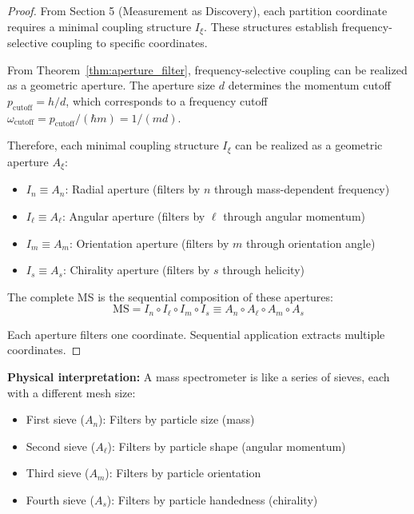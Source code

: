 \begin{proof}
From Section 5 (Measurement as Discovery), each partition coordinate requires a minimal coupling structure $I_\xi$. These structures establish frequency-selective coupling to specific coordinates.

From Theorem~\ref{thm:aperture_filter}, frequency-selective coupling can be realized as a geometric aperture. The aperture size $d$ determines the momentum cutoff $p_{\text{cutoff}} = h/d$, which corresponds to a frequency cutoff $\omega_{\text{cutoff}} = p_{\text{cutoff}}/(\hbar m) = 1/(md)$.

Therefore, each minimal coupling structure $I_\xi$ can be realized as a geometric aperture $A_\xi$:
\begin{itemize}
    \item $I_n \equiv A_n$: Radial aperture (filters by $n$ through mass-dependent frequency)
    \item $I_\ell \equiv A_\ell$: Angular aperture (filters by $\ell$ through angular momentum)
    \item $I_m \equiv A_m$: Orientation aperture (filters by $m$ through orientation angle)
    \item $I_s \equiv A_s$: Chirality aperture (filters by $s$ through helicity)
\end{itemize}

The complete MS is the sequential composition of these apertures:
\begin{equation}
\text{MS} = I_n \circ I_\ell \circ I_m \circ I_s \equiv A_n \circ A_\ell \circ A_m \circ A_s
\end{equation}

Each aperture filters one coordinate. Sequential application extracts multiple coordinates.
\end{proof}

\textbf{Physical interpretation:} A mass spectrometer is like a series of sieves, each with a different mesh size:
\begin{itemize}
    \item First sieve ($A_n$): Filters by particle size (mass)
    \item Second sieve ($A_\ell$): Filters by particle shape (angular momentum)
    \item Third sieve ($A_m$): Filters by particle orientation
    \item Fourth sieve ($A_s$): Filters by particle handedness (chirality)
\end{itemize}

